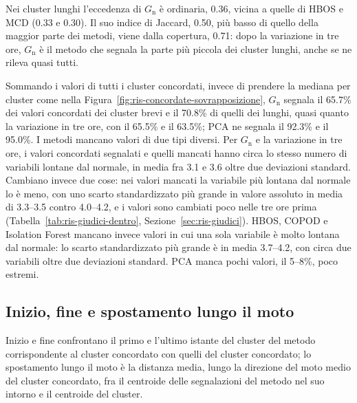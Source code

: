 Nei cluster lunghi l'eccedenza di $G_{\mathrm{n}}$ è ordinaria, 0.36, vicina a quelle di HBOS e MCD (0.33 e 0.30). Il suo indice di Jaccard, 0.50, più basso di quello della maggior parte dei metodi, viene dalla copertura, 0.71: dopo la variazione in tre ore, $G_{\mathrm{n}}$ è il metodo che segnala la parte più piccola dei cluster lunghi, anche se ne rileva quasi tutti.

Sommando i valori di tutti i cluster concordati, invece di prendere la mediana per cluster come nella Figura~\ref{fig:ris-concordate-sovrapposizione}, $G_{\mathrm{n}}$ segnala il 65.7\% dei valori concordati dei cluster brevi e il 70.8\% di quelli dei lunghi, quasi quanto la variazione in tre ore, con il 65.5\% e il 63.5\%; PCA ne segnala il 92.3\% e il 95.0\%. I metodi mancano valori di due tipi diversi. Per $G_{\mathrm{n}}$ e la variazione in tre ore, i valori concordati segnalati e quelli mancati hanno circa lo stesso numero di variabili lontane dal normale, in media fra 3.1 e 3.6 oltre due deviazioni standard. Cambiano invece due cose: nei valori mancati la variabile più lontana dal normale lo è meno, con uno scarto standardizzato più grande in valore assoluto in media di 3.3--3.5 contro 4.0--4.2, e i valori sono cambiati poco nelle tre ore prima (Tabella~\ref{tab:ris-giudici-dentro}, Sezione~\ref{sec:ris-giudici}). HBOS, COPOD e Isolation Forest mancano invece valori in cui una sola variabile è molto lontana dal normale: lo scarto standardizzato più grande è in media 3.7--4.2, con circa due variabili oltre due deviazioni standard. PCA manca pochi valori, il 5--8\%, poco estremi.

\subsection{Inizio, fine e spostamento lungo il moto}
\label{sec:ris-concordate-inizio}

Inizio e fine confrontano il primo e l'ultimo istante del cluster del metodo corrispondente al cluster concordato con quelli del cluster concordato; lo spostamento lungo il moto è la distanza media, lungo la direzione del moto medio del cluster concordato, fra il centroide delle segnalazioni del metodo nel suo intorno e il centroide del cluster.

